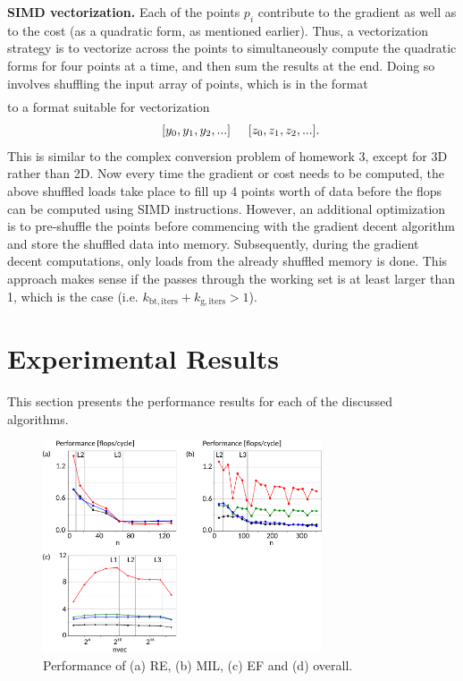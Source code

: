 \documentclass[letterpaper]{article}
\newcommand{\mypar}[1]{{\bf #1.}}
\begin{document}
\mypar{SIMD vectorization}
Each of the points $p_i$ contribute to the gradient as well as to the cost (as a quadratic form, as mentioned earlier). Thus, a vectorization strategy is to vectorize across the points to simultaneously compute the quadratic forms for four points at a time, and then sum the results at the end. Doing so involves shuffling the input array of points, which is in the format 
\begin{align*}
  [x_0, y_0, z_0, x_1, y_1, z_1, x_2, y_2, ...]
\end{align*}
to a format suitable for vectorization
\begin{align*}
  [x_0, x_1, x_2, ...] \hspace{5mm} [y_0, y_1, y_2, ...] \hspace{5mm} [z_0, z_1, z_2, ...].
\end{align*}
This is similar to the complex conversion problem of homework 3, except for 3D rather than 2D. Now every time the gradient or cost needs to be computed, the above shuffled loads take place to fill up 4 points worth of data before the flops can be computed using SIMD instructions. However, an additional optimization is to pre-shuffle the points before commencing with the gradient decent algorithm and store the shuffled data into memory. Subsequently, during the gradient decent computations, only loads from the already shuffled memory is done. This approach makes sense if the passes through the working set is at least larger than 1, which is the case (i.e. $k_\mathrm{bt,iters}+k_\mathrm{g,iters} > 1$). 

\section{Experimental Results}\label{sec:exp}
This section presents the performance results for each of the discussed algorithms.
\begin{figure}[H]
  \centering \includegraphics[width=3.25in]{figs/plots/overall/overall_performance.pdf}
  \caption{Performance of (a) RE, (b) MIL, (c) EF and (d) overall.}
  \label{fig:performance}
\end{figure}
\end{document}

